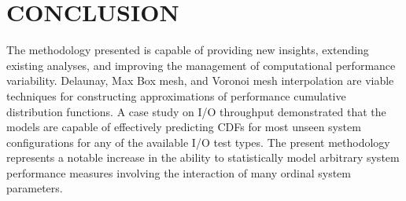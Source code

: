 \documentclass[smallextended]{svjour3}       %
\begin{document}
\section{CONCLUSION}
\label{sec:conclusion}

The methodology presented is capable of providing new insights, extending existing analyses, and improving the management of computational performance variability. Delaunay, Max Box mesh, and Voronoi mesh interpolation are viable techniques for constructing approximations of performance cumulative distribution functions. A case study on I/O throughput demonstrated that the models are capable of effectively predicting CDFs for most unseen system configurations for any of the available I/O test types. The present methodology represents a notable increase in the ability to statistically model arbitrary system performance measures involving the interaction of many ordinal system parameters.




\end{document}
